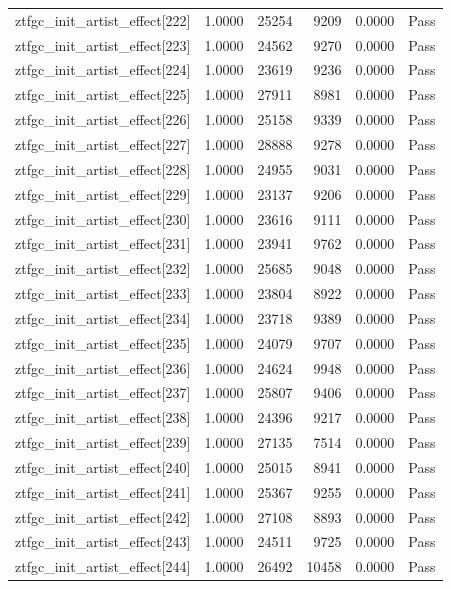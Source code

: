 \begin{table}[htbp]
\begin{tabular}{llrrll}
ztfgc\_init\_artist\_effect[222] & 1.0000 & 25254 & 9209 & 0.0000 & Pass \\
ztfgc\_init\_artist\_effect[223] & 1.0000 & 24562 & 9270 & 0.0000 & Pass \\
ztfgc\_init\_artist\_effect[224] & 1.0000 & 23619 & 9236 & 0.0000 & Pass \\
ztfgc\_init\_artist\_effect[225] & 1.0000 & 27911 & 8981 & 0.0000 & Pass \\
ztfgc\_init\_artist\_effect[226] & 1.0000 & 25158 & 9339 & 0.0000 & Pass \\
ztfgc\_init\_artist\_effect[227] & 1.0000 & 28888 & 9278 & 0.0000 & Pass \\
ztfgc\_init\_artist\_effect[228] & 1.0000 & 24955 & 9031 & 0.0000 & Pass \\
ztfgc\_init\_artist\_effect[229] & 1.0000 & 23137 & 9206 & 0.0000 & Pass \\
ztfgc\_init\_artist\_effect[230] & 1.0000 & 23616 & 9111 & 0.0000 & Pass \\
ztfgc\_init\_artist\_effect[231] & 1.0000 & 23941 & 9762 & 0.0000 & Pass \\
ztfgc\_init\_artist\_effect[232] & 1.0000 & 25685 & 9048 & 0.0000 & Pass \\
ztfgc\_init\_artist\_effect[233] & 1.0000 & 23804 & 8922 & 0.0000 & Pass \\
ztfgc\_init\_artist\_effect[234] & 1.0000 & 23718 & 9389 & 0.0000 & Pass \\
ztfgc\_init\_artist\_effect[235] & 1.0000 & 24079 & 9707 & 0.0000 & Pass \\
ztfgc\_init\_artist\_effect[236] & 1.0000 & 24624 & 9948 & 0.0000 & Pass \\
ztfgc\_init\_artist\_effect[237] & 1.0000 & 25807 & 9406 & 0.0000 & Pass \\
ztfgc\_init\_artist\_effect[238] & 1.0000 & 24396 & 9217 & 0.0000 & Pass \\
ztfgc\_init\_artist\_effect[239] & 1.0000 & 27135 & 7514 & 0.0000 & Pass \\
ztfgc\_init\_artist\_effect[240] & 1.0000 & 25015 & 8941 & 0.0000 & Pass \\
ztfgc\_init\_artist\_effect[241] & 1.0000 & 25367 & 9255 & 0.0000 & Pass \\
ztfgc\_init\_artist\_effect[242] & 1.0000 & 27108 & 8893 & 0.0000 & Pass \\
ztfgc\_init\_artist\_effect[243] & 1.0000 & 24511 & 9725 & 0.0000 & Pass \\
ztfgc\_init\_artist\_effect[244] & 1.0000 & 26492 & 10458 & 0.0000 & Pass \\

\end{tabular}
\end{table}
